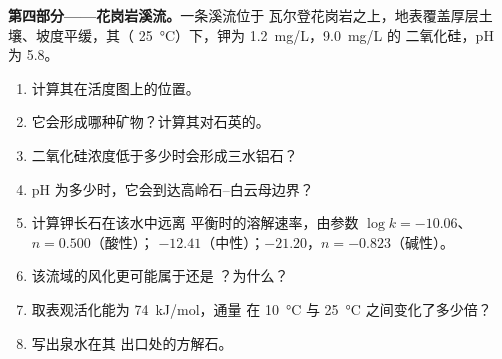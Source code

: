 \begin{problem}
\medskip\noindent\textbf{第四部分——花岗岩溪流。}一条溪流位于
瓦尔登花岗岩之上，地表覆盖厚层土壤、坡度平缓，其（
\qty{25}{\celsius}）下，钾为 \qty{1.2}{mg/L}，\qty{9.0}{mg/L} 的
二氧化硅，pH 为 5.8。
\begin{enumerate}[resume]
\item 计算其在活度图上的位置。
\item 它会形成哪种矿物？计算其对石英的。
\item 二氧化硅浓度低于多少时会形成三水铝石？
\item pH 为多少时，它会到达高岭石–白云母边界？
\item 计算钾长石在该水中远离
  平衡时的溶解速率，由参数 $\log k = -10.06$、$n = 0.500$（酸性）；
  $-12.41$（中性）；$-21.20$，$n = -0.823$（碱性）。
\item 该流域的风化更可能属于还是
  ？为什么？
\item 取表观活化能为 \qty{74}{kJ/mol}，通量
  在 \qty{10}{\celsius} 与
  \qty{25}{\celsius} 之间变化了多少倍？
\item 写出泉水在其
  出口处的方解石。
\end{enumerate}
\end{problem}
